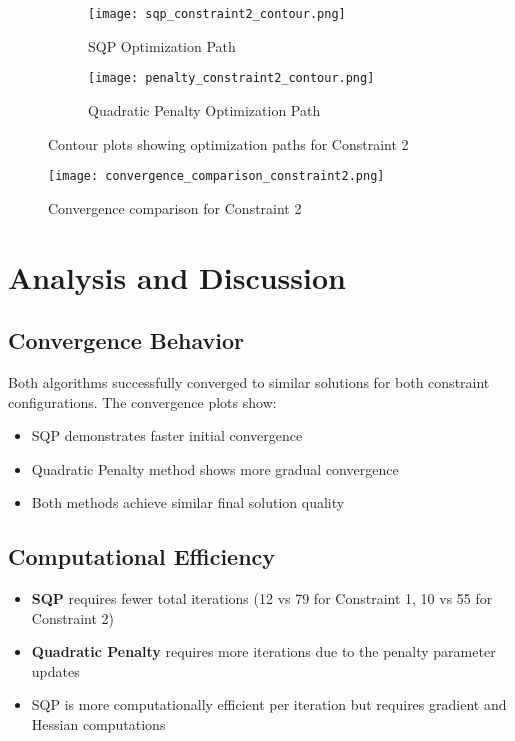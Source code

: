 \documentclass[11pt,a4paper]{article}
\begin{document}
\begin{figure}[H]
\centering
\begin{subfigure}{0.48\textwidth}
    \centering
    \texttt{[image: sqp\_constraint2\_contour.png]}
    \caption{SQP Optimization Path}
\end{subfigure}
\hfill
\begin{subfigure}{0.48\textwidth}
    \centering
    \texttt{[image: penalty\_constraint2\_contour.png]}
    \caption{Quadratic Penalty Optimization Path}
\end{subfigure}
\caption{Contour plots showing optimization paths for Constraint 2}
\end{figure}

\begin{figure}[H]
\centering
\texttt{[image: convergence\_comparison\_constraint2.png]}
\caption{Convergence comparison for Constraint 2}
\end{figure}

\section{Analysis and Discussion}

\subsection{Convergence Behavior}
Both algorithms successfully converged to similar solutions for both constraint configurations. The convergence plots show:

\begin{itemize}
    \item SQP demonstrates faster initial convergence
    \item Quadratic Penalty method shows more gradual convergence
    \item Both methods achieve similar final solution quality
\end{itemize}

\subsection{Computational Efficiency}
\begin{itemize}
    \item \textbf{SQP} requires fewer total iterations (12 vs 79 for Constraint 1, 10 vs 55 for Constraint 2)
    \item \textbf{Quadratic Penalty} requires more iterations due to the penalty parameter updates
    \item SQP is more computationally efficient per iteration but requires gradient and Hessian computations
\end{itemize}
\end{document}
